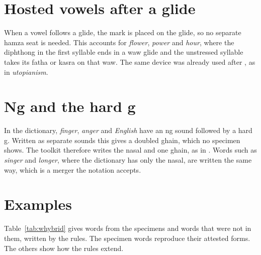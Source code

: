 \section{Hosted vowels after a glide}
When a vowel follows a glide, the mark is placed on the glide, so no separate hamza seat is needed. This accounts for \emph{flower}, \emph{power} and \emph{hour}, where the diphthong in the first syllable ends in a waw glide and the unstressed syllable takes its fatha or kasra on that waw. The same device was already used after , as in \emph{utopianism}.

\section{Ng and the hard g}
In the dictionary, \emph{finger}, \emph{anger} and \emph{English} have an ng sound followed by a hard g. Written as separate sounds this gives a doubled ghain, which no specimen shows. The toolkit therefore writes the nasal and one ghain, as in . Words such as \emph{singer} and \emph{longer}, where the dictionary has only the nasal, are written the same way, which is a merger the notation accepts.

\section{Examples}
Table~\ref{tab:whybrid} gives words from the specimens and words that were not in them, written by the rules. The specimen words reproduce their attested forms. The others show how the rules extend.

\begin{table}[ht]\centering\small

\caption{Words that exercise the spelling-conditioned rules.}\label{tab:whybrid}
\end{table}
